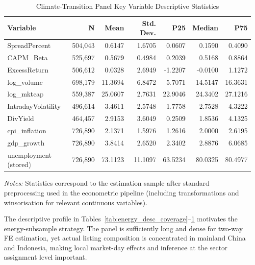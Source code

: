 \documentclass{article}
\theoremstyle{plain}
\begin{document}
\begin{table}[htbp]
\centering
\caption{Climate-Transition Panel Key Variable Descriptive Statistics}
\label{tab:energy_desc_vars}
\begin{threeparttable}
\small
\setlength{\tabcolsep}{4pt}
\begin{tabular}{l r r r r r r}
\toprule
Variable & N & Mean & Std. Dev. & P25 & Median & P75 \\
\midrule
SpreadPercent & 504,043 & 0.6147 & 1.6705 & 0.0607 & 0.1590 & 0.4090 \\
CAPM\_Beta & 525,697 & 0.5679 & 0.4984 & 0.2039 & 0.5168 & 0.8864 \\
ExcessReturn & 506,612 & 0.0328 & 2.6949 & -1.2207 & -0.0100 & 1.1272 \\
log\_volume & 698,179 & 11.3694 & 6.8472 & 5.7071 & 14.5147 & 16.3631 \\
log\_mktcap & 559,387 & 25.0607 & 2.7631 & 22.9046 & 24.3402 & 27.1216 \\
IntradayVolatility & 496,614 & 3.4611 & 2.5748 & 1.7758 & 2.7528 & 4.3222 \\
DivYield & 464,457 & 2.9153 & 3.6049 & 0.2509 & 1.8536 & 4.1325 \\
cpi\_inflation & 726,890 & 2.1371 & 1.5976 & 1.2616 & 2.0000 & 2.6195 \\
gdp\_growth & 726,890 & 3.8414 & 2.6520 & 2.3402 & 2.8876 & 6.0685 \\
unemployment (stored) & 726,890 & 73.1123 & 11.1097 & 63.5234 & 80.0325 & 80.4977 \\
\bottomrule
\end{tabular}
\begin{tablenotes}\small
\item \textit{Notes:} Statistics correspond to the estimation sample after standard preprocessing used in the econometric pipeline (including transformations and winsorisation for relevant continuous variables).
\end{tablenotes}
\end{threeparttable}
\end{table}

The descriptive profile in Tables~\ref{tab:energy_desc_coverage}--\ref{tab:energy_desc_vars} motivates the energy-subsample strategy. The panel is sufficiently long and dense for two-way FE estimation, yet actual listing composition is concentrated in mainland China and Indonesia, making local market-day effects and inference at the sector assignment level important.

\FloatBarrier
\FloatBarrier


\FloatBarrier
\end{document}
